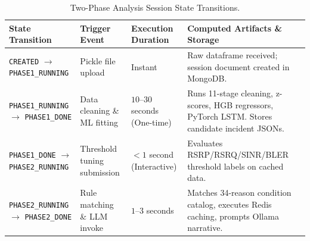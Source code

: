 \documentclass[12pt,a4paper]{report}
\begin{document}
\begin{table}[htbp]
\centering
\caption{Two-Phase Analysis Session State Transitions.}
\label{tab:session_state_machine}
\small
\begin{tabular}{lllp{6cm}}
\toprule
\textbf{State Transition} & \textbf{Trigger Event} & \textbf{Execution Duration} & \textbf{Computed Artifacts \& Storage} \\
\midrule
\texttt{CREATED} $\rightarrow$ \texttt{PHASE1\_RUNNING} & Pickle file upload & Instant & Raw dataframe received; session document created in MongoDB. \\
\texttt{PHASE1\_RUNNING} $\rightarrow$ \texttt{PHASE1\_DONE} & Data cleaning \& ML fitting & $10$--$30$ seconds (One-time) & Runs 11-stage cleaning, z-scores, HGB regressors, PyTorch LSTM. Stores candidate incident JSONs. \\
\texttt{PHASE1\_DONE} $\rightarrow$ \texttt{PHASE2\_RUNNING} & Threshold tuning submission & $<1$ second (Interactive) & Evaluates RSRP/RSRQ/SINR/BLER threshold labels on cached data. \\
\texttt{PHASE2\_RUNNING} $\rightarrow$ \texttt{PHASE2\_DONE} & Rule matching \& LLM invoke & $1$--$3$ seconds & Matches 34-reason condition catalog, executes Redis caching, prompts Ollama narrative. \\
\bottomrule
\end{tabular}
\end{table}
\end{document}
